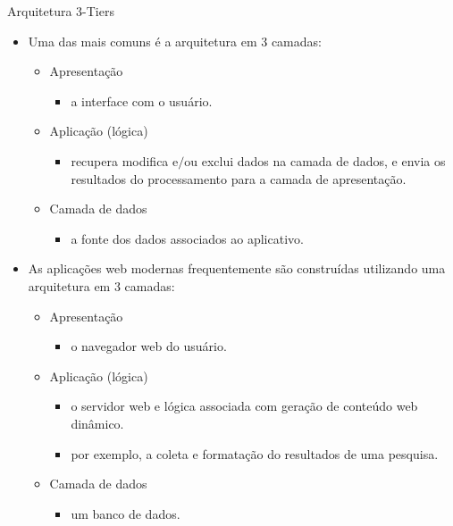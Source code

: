 \begin{frame}{Arquitetura 3-Tiers}
  \begin{itemize}
    \item Uma das mais comuns é a arquitetura em 3 camadas: 
    \begin{itemize}
      \item Apresentação
      \begin{itemize}
       \item a interface com o usuário. 
      \end{itemize}     
      \item Aplicação (lógica)
      \begin{itemize}
	\item recupera modifica e$/$ou exclui dados na camada de dados, e envia os resultados do processamento
	para a camada de apresentação. 
      \end{itemize}
      \item Camada de dados
      \begin{itemize}
       \item a fonte dos dados associados ao aplicativo.
      \end{itemize}
    \end{itemize}
 
    \item As aplicações web modernas frequentemente são construídas \alert{utilizando} uma arquitetura em 3 camadas: 
    \begin{itemize}
      \item Apresentação
      \begin{itemize}
	\item o navegador web do usuário. 
      \end{itemize}

      \item Aplicação (lógica) 
      \begin{itemize}     
	\item o servidor web e lógica associada com \alert{geração} de conteúdo web dinâmico.
	\item por exemplo, a coleta e formatação do resultados de uma pesquisa. 
      \end{itemize}
      
      \item Camada de dados
      \begin{itemize}    
	\item um banco de dados.
      \end{itemize}
      
    \end{itemize}
    
  \end{itemize}
\end{frame}
